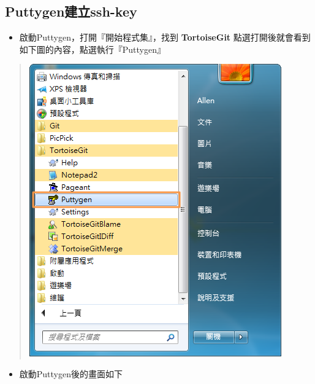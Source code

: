 \documentclass[letterpaper,10pt,english]{sphinxmanual}
\begin{document}
\subsection{Puttygen建立ssh-key}
\label{_doc/writing/index:puttygenssh-key}\label{_doc/writing/index:ssh-key-puttygen}\begin{itemize}
\item {} 
啟動Puttygen，打開『開始程式集』，找到 \textbf{TortoiseGit} 點選打開後就會看到如下圖的內容，點選執行『Puttygen』

\end{itemize}
\begin{quote}

\includegraphics{puttygen-001.png}
\end{quote}
\begin{itemize}
\item {} 
啟動Puttygen後的畫面如下

\end{itemize}
\end{document}
